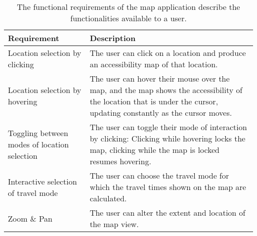 \begin{table}[H]
	\caption{
		The functional requirements of the map application describe
		the functionalities available to a user.
	}
	\label{tab:functional requirements}
	\centering
	\begin{tabular}{ | L{0.3\textwidth} | L{0.6\textwidth} | }
		\hline
		\textbf{Requirement}
		& \textbf{Description}
		\\
		\hline
		\hline
		Location selection by clicking
		& The user can click on a location and produce an accessibility map of that location.
		\\
		\hline
		Location selection by hovering
		& The user can hover their mouse over the map,
		and the map shows the accessibility of the location that is under the cursor,
		updating constantly as the cursor moves.
		\\
		\hline
		Toggling between modes of location selection
		& The user can toggle their mode of interaction by clicking:
		Clicking while hovering locks the map, clicking while the map is locked resumes hovering.
		\\
		\hline
		Interactive selection of travel mode
		& The user can choose the travel mode for which the travel times shown on the map are calculated.
		\\
		\hline
		Zoom \& Pan
		& The user can alter the extent and location of the map view.
		\\
		\hline
	\end{tabular}
\end{table}
